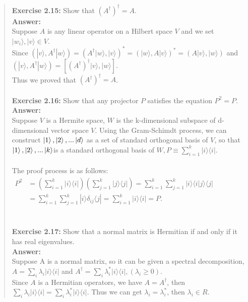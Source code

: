 \documentclass[UTF8]{ctexart}
\begin{document}
\begin{quote}
\textbf{Exercise 2.15:} Show that $\left(A^{\dagger}\right)^{\dagger}=A.$  \\
	\textbf{Answer:}\\
	Suppose $A$ is any linear operator on a Hilbert space $V$ and we set  $ |w_{i}\rangle ,| v\rangle \in V$. \\ 
Since $\left(|v\rangle, A^{\dagger}|w\rangle\right)=\left(A^{\dagger}|w\rangle,|v\rangle\right)^{*}=\left(|w\rangle, A|v\rangle\right)^{*}=\left(A|v\rangle,|w\rangle\right)$
	and $\left(|v\rangle, A^{\dagger}|w\rangle\right)=\left[\left(A^{\dagger}\right)^{\dagger}|v\rangle,|w\rangle\right].$
	\\
	Thus we proved that $\left(A^{\dagger}\right)^{\dagger}=A$.
	\\  \\ 
\textbf{Exercise 2.16:} Show that any projector $P$ satisfies the equation $P^{2}=P$. \\
\textbf{Answer:}\\
	Suppose $V$ is a  Hermite space, $W$ is the k-dimensional subspace of d-dimensional vector space $V$. Using the Gram-Schimdt process, we can construct $ \ket{1}, \ket{2}, . . .\ket{d}$ as a set of standard orthogonal basis of $V$, so that $ \ket{1}, \ket{2}, . . .\ket{k} $is a standard orthogonal basis of $W  ,P \equiv \sum_{i=1}^{k}|i\rangle\langle i|.$ \\ \\
	The proof process is as follows: \\
	$\begin{aligned} P^{2} &=(\sum_{i=1}^{k}|i\rangle\langle i|)(\sum_{j=1}^{k}|j\rangle\langle j|)=\sum_{i=1}^{k}\sum_{j=1}^{k}|i\rangle\langle i | j\rangle\langle j| \\ 	&=\sum_{i=1}^{k}\sum_{j=1}^{k}|i\rangle \delta_{i j}\langle j|=\sum_{i=1}^{k}| i\rangle\langle i|=P. \end{aligned}$\\  \\  
	\\
\textbf{Exercise 2.17:} Show that a normal matrix is Hermitian if and only if it has real eigenvalues.
	\\ 
	\textbf{Answer:}\\
	Suppose A is a normal matrix, so it can be given a spectral decomposition,  $A= \sum_{i}\lambda_{i}|i\rangle\langle i|$ and  $A^{\dagger} = \sum_{i}\lambda_{i}^{*}|i\rangle\langle i|, (\lambda_{i}\geq 0)$. \\
	Since $A$ is a Hermitian operators, we have $A=A^{\dagger}$, then $\sum_{i}\lambda_{i}|i\rangle\langle i|= \sum_{i}\lambda_{i}^{*}|i\rangle\langle i|$. Thus we can get $\lambda_{i} =\lambda_{i}^{*}$, then $\lambda_{i} \in R$.

\end{quote}
\end{document}
